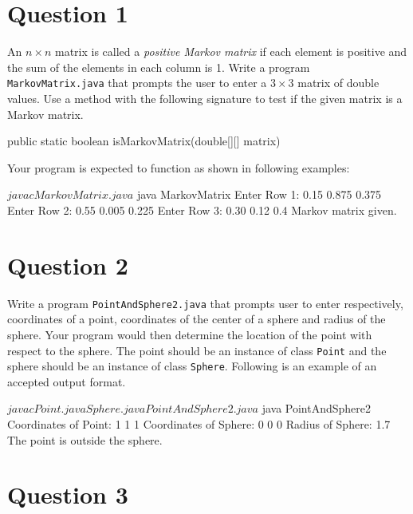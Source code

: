 \documentclass[12pt,letterpaper,twoside]{article}
\begin{document}


\section*{Question 1}

An $n \times n$ matrix is called a \textit{positive Markov matrix} if each element is positive and the sum of the elements in each column is 1.
Write a program \texttt{MarkovMatrix.java} that prompts the user to enter a $3 \times 3$ matrix of double values.
Use a method with the following signature to test if the given matrix is a Markov matrix.

\begin{terminal}
public static boolean isMarkovMatrix(double[][] matrix)
\end{terminal}

Your program is expected to function as shown in following examples:

\begin{terminal}
$ javac MarkovMatrix.java
$ java MarkovMatrix
Enter Row 1: 0.15 0.875 0.375
Enter Row 2: 0.55 0.005 0.225
Enter Row 3: 0.30 0.12 0.4
Markov matrix given.
\end{terminal}

\section*{Question 2}

Write a program \texttt{PointAndSphere2.java} that prompts user to enter respectively, coordinates of a point, coordinates of the center of a sphere and radius of the sphere.
Your program would then determine the location of the point with respect to the sphere.
The point should be an instance of class \texttt{Point} and the sphere should be an instance of class \texttt{Sphere}.
Following is an example of an accepted output format.

\vfill
\newpage

\begin{terminal}
$ javac Point.java Sphere.java PointAndSphere2.java
$ java PointAndSphere2
Coordinates of Point: 1 1 1
Coordinates of Sphere: 0 0 0
Radius of Sphere: 1.7
The point is outside the sphere.
\end{terminal}

\section*{Question 3}
\end{document}

